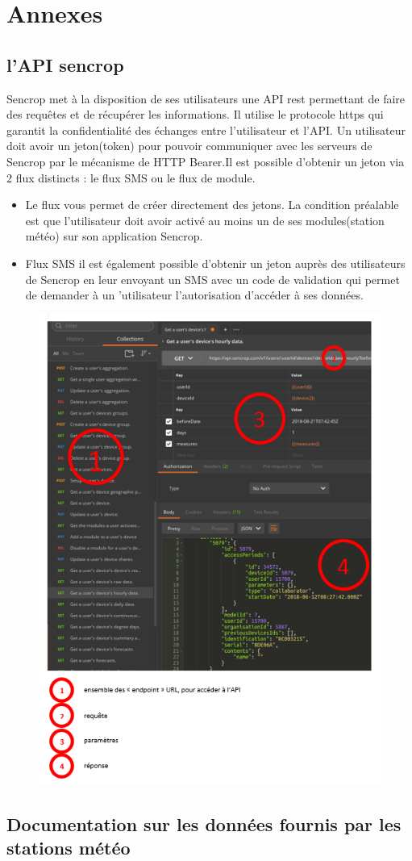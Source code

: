 \part{Annexes}
    \chapter{l'API sencrop}
  Sencrop met à la disposition de ses utilisateurs une API rest permettant de faire des requêtes et de récupérer les informations. Il utilise le protocole https qui garantit la confidentialité des échanges entre l’utilisateur et l’API. Un utilisateur doit avoir un jeton(token)  pour pouvoir communiquer avec les serveurs de Sencrop par le mécanisme de HTTP Bearer.Il est possible d’obtenir un jeton  via 2 flux distincts : le flux SMS ou le flux de module.
  \begin{itemize}
      \item Le flux vous permet de créer directement des jetons. La condition préalable est que l'utilisateur doit avoir activé au moins un de ses modules(station météo) sur son application Sencrop.
      \item Flux SMS il est également possible d’obtenir un jeton auprès des utilisateurs de Sencrop en leur envoyant un SMS avec un code de validation qui  permet de demander à un 'utilisateur l'autorisation d'accéder à ses données.
  \end{itemize}

    \begin{figure}[!h]
        \centering
        \includegraphics[height=.5\textheight]{images/api_image.jpg}
    \end{figure}
    
    
    \chapter{Documentation sur les données fournis par les stations météo}
    